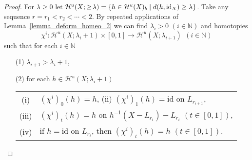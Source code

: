 \documentclass[11pt, fleqn]{amsart}
\theoremstyle{definition}
\newcommand{\cal}{\mathcal}
\newcommand{\lra}{\longrightarrow}
\newcommand{\id}{\mathrm{id}}
\newcommand{\IN}{\mathbb N}
\begin{document}
\begin{proof} For $\lambda \geq 0$ let 
${\cal H}^u(X; \geq \hspace{-0.5mm}\lambda) = \{ h \in {\cal H}^u(X)_b \mid d(h, \id_X) \geq \lambda \}$.  
Take any sequence $r = r_1 < r_2 < \cdots < 2$. 
By repeated applications of Lemma~\ref{lemma_deform_homeo_2} we can find $\lambda_i > 0$ $(i \in \IN)$ and homotopies  
$$\chi^i : {\cal H}^u(X; \lambda_i+1) \times [0,1] \lra {\cal H}^u(X; \lambda_{i+1}) \ \ (i \in \IN)$$ 
such that for each $i \in \IN$ 
\begin{itemize}
\item[(1)] $\lambda_{i+1} > \lambda_i + 1$, 
\item[(2)] for each $h \in {\cal H}^u(X; \lambda_i+1)$ \\
\begin{tabular}[t]{c@{\ }l} 
(i) & $(\chi^i)_0(h) = h$, \hspace{3mm} (ii) $(\chi^i)_1(h) = \id$ on $L_{r_{i+1}}$, \\[2mm]
(iii) & $(\chi^i)_t(h) = h$ on $h^{-1}(X - L_{r_i}) - L_{r_i}$ $(t \in [0,1])$, \\[2mm]  
(iv) & if $h = \id$ on $L_{r_i}$, then $(\chi^i)_t(h) = h$ $(t \in [0,1])$. 
\end{tabular}
\end{itemize} 
\vskip 1mm 


\end{proof}
\end{document}
